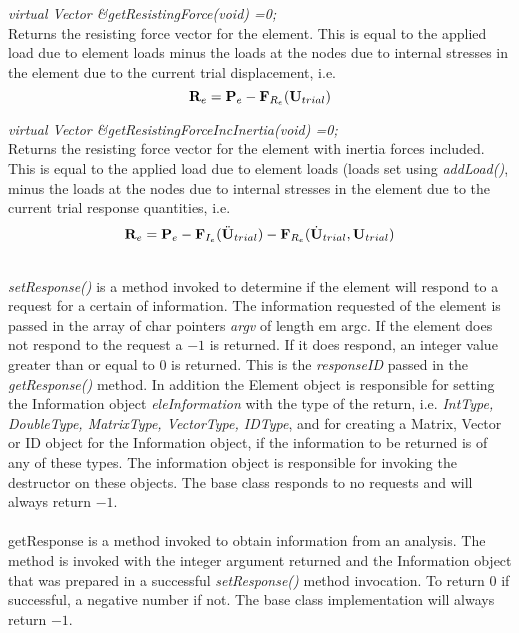 {\em virtual Vector \&getResistingForce(void) =0;} \\
Returns the resisting force vector for the element. This is equal to
the applied load due to element loads minus the loads at the nodes due
to internal stresses in the element due to the current trial
displacement, i.e. 
$$
{\bf R}_e = 
{\bf P}_{e} - {\bf F}_{R_e}({\bf U}_{trial}) 
$$

{\em virtual Vector \&getResistingForceIncInertia(void) =0;} \\
Returns the resisting force vector for the element with inertia forces
included. This is equal to the applied load due to element loads
(loads set using {\em addLoad()}, minus the loads at the nodes due to
internal stresses in the element due to the current trial response
quantities, i.e.
$$
{\bf R}_e = 
{\bf P}_e -  {\bf F}_{I_e} (\ddot {{\bf U}}_{trial}) - {\bf F}_{R_e}(\dot
{{\bf U}}_{trial}, {\bf U}_{trial})
$$


\\
{\em setResponse()} is a method invoked to determine if the element
will respond to a request for a certain of information. The
information requested of the element is passed in the array of char
pointers {\em argv} of length {em argc}. If the element does not
respond to the request a $-1$ is returned. If it does respond, an
integer value greater than or equal to $0$ is returned. This is the
{\em responseID} passed in the {\em getResponse()} method. In addition
the Element object is responsible for setting the Information object
{\em eleInformation} with the type of the return, i.e. {\em IntType,
DoubleType, MatrixType, VectorType, IDType}, and for creating a Matrix,
Vector or ID object for the Information object, if the information to
be returned is of any of these types. The information object is
responsible for invoking the destructor on these objects. The base
class responds to no requests and will always return $-1$. \\

\\ 
getResponse is a method invoked to obtain information from an
analysis. The method is invoked with the integer argument returned and
the Information object that was prepared in a successful {\em
setResponse()} method invocation. To return $0$ if successful, a
negative number if not. The base class implementation will always
return $-1$. 
